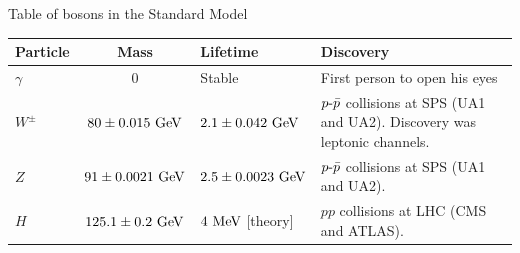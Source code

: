 \begin{table}
\begin{center}
Table of bosons in the Standard Model \\
\def\arraystretch{1.5}
\begin{tabular}{|l||c|p{}|p{}|}
\hline
Particle & Mass & Lifetime & Discovery\\
\hline
\hline
$\gamma$ & 0 & Stable & First person to open his eyes\\ \hline
$W^\pm$ & $80 \pm 0.015~\text{GeV}$ & $2.1 \pm 0.042~\text{GeV}$ & $p\textto\bar p$ collisions at SPS (UA1 and UA2). Discovery was leptonic channels. \\ \hline
$Z$ & $91 \pm 0.0021~\text{GeV}$ & $2.5 \pm 0.0023~\text{GeV}$ & $p\textto\bar p$ collisions at SPS (UA1 and UA2). \\ \hline
$H$ & $125.1 \pm 0.2~\text{GeV}$ & $4~\text{MeV}$ [theory] & $pp$ collisions at LHC (CMS and ATLAS). \\ \hline
\end{tabular}

\vspace{5mm}


\end{center}
\end{table}
